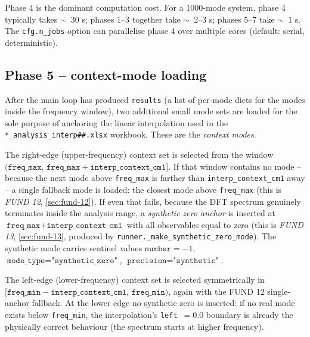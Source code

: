 \documentclass[10pt,a4paper,twoside]{article}
\newcommand{\codref}[1]{%
  \quad\text{\textcolor{gray!70!black}{\footnotesize $\rightsquigarrow$~\texttt{#1}}}}
\newcommand{\fn}[1]{\texttt{#1}}
\newcommand{\file}[1]{\texttt{#1}}
\newcommand{\cfgkey}[1]{\texttt{#1}}
\begin{document}
Phase 4 is the dominant computation cost. For a 1000-mode system,
phase 4 typically takes \mbox{$\sim$}~30 s; phases 1--3 together take
\mbox{$\sim$}~2--3 s; phases 5--7 take \mbox{$\sim$}~1 s. The
\fn{cfg.n\_jobs} option can parallelise phase 4 over multiple cores
(default: serial, deterministic).

\subsection{Phase 5 -- context-mode loading}
\label{sec:phase5-context}

\codref{runner.\_run\_analysis\_single}

After the main loop has produced \fn{results} (a list of per-mode
dicts for the modes inside the frequency window), two additional
small mode sets are loaded for the sole purpose of anchoring the
linear interpolation used in the \file{*\_analysis\_interp\#\#.xlsx}
workbook. These are the \emph{context modes}.

The right-edge (upper-frequency) context set is selected from the
window $(\cfgkey{freq\_max},\, \cfgkey{freq\_max}+
\cfgkey{interp\_context\_cm1}]$. If that window contains no mode --
because the next mode above \cfgkey{freq\_max} is farther than
\cfgkey{interp\_context\_cm1} away -- a single fallback mode is
loaded: the closest mode above \cfgkey{freq\_max} (this is
\emph{FUND 12}, \cref{sec:fund-12}). If even that fails, because the
DFT spectrum genuinely terminates inside the analysis range, a
\emph{synthetic zero anchor} is inserted at
$\cfgkey{freq\_max} + \cfgkey{interp\_context\_cm1}$ with all
observables equal to zero (this is \emph{FUND 13},
\cref{sec:fund-13}, produced by \fn{runner.\_make\_synthetic\_zero\_mode}). The synthetic mode carries sentinel values
$\texttt{number} = -1$, $\texttt{mode\_type} = \texttt{"synthetic\_zero"}$,
$\texttt{precision} = \texttt{"synthetic"}$.

The left-edge (lower-frequency) context set is selected symmetrically
in $[\cfgkey{freq\_min} - \cfgkey{interp\_context\_cm1},\,
\cfgkey{freq\_min})$, again with the FUND 12 single-anchor fallback.
At the lower edge no synthetic zero is inserted: if no real mode
exists below \cfgkey{freq\_min}, the interpolation's
\texttt{left}~$= 0.0$ boundary is already the physically correct
behaviour (the spectrum starts at higher frequency).
\end{document}
